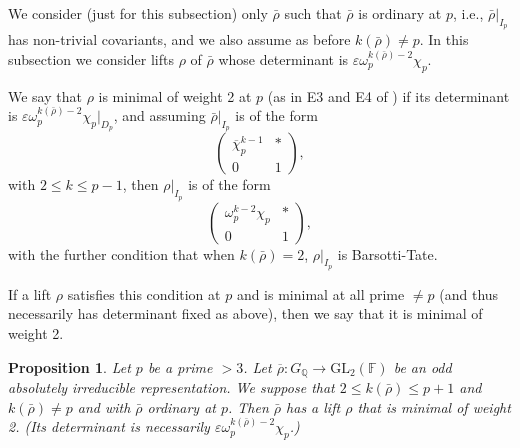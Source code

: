 \documentclass[12pt]{amsart}
\newcommand{\Q}{\mathbb{Q}}
\newcommand{\rhobar}{\overline{\rho}}
\newtheorem{prop}[theorem]{Proposition}
\def\rhobar{ {\bar {\rho} } }
\def\rhob{ {\bar {\rho} } }
\newcommand{\F}{{\mathbb F}}
\newcommand{\vep}{{\varepsilon}}
\begin{document}
We consider (just for this subsection) only
$\rhob$ such that
$\rhob$ is ordinary at $p$, i.e., $\rhob|_{I_p}$ has non-trivial
covariants, and we also assume as before $k(\rhob) \neq p$.
In this subsection we consider lifts 
$\rho$ of $\rhobar$ whose determinant is $\vep\omega_p^{k(\rhob)-2}\chi_p$.


We say that $\rho$ is minimal of weight 2 at $p$ (as in E3 and E4 of
\cite{Tay3})  if 
its determinant is $\vep\omega_p^{k(\rhob)-2}\chi_p|_{D_p}$, and assuming $\rhob|_{I_p}$
is of the form
$$\left( \begin{array}{cc}
    \overline \chi_p ^{k-1} & *  \\
    0 & 1
\end{array} \right),$$ with $2 \leq k \leq p-1$, then $\rho|_{I_p}$ is of
the form
$$\left( \begin{array}{cc}
    \omega_p^{k-2}\chi_p  & *  \\
    0 & 1
\end{array} \right),$$ with the further condition that when $k(\rhobar)=2$, $\rho|_{I_p}$ is Barsotti-Tate. 

If a lift $\rho$ satisfies this condition at $p$ and is minimal at all prime $\neq p$ (and thus necessarily
has determinant fixed as above), then we say that it is minimal
of weight 2.

\begin{prop}\label{p}
Let $p$ be a prime $> 3$.
Let $\overline{\rho} : G_{\Q}\rightarrow
\mathrm{GL}_2 (\F)$ be an odd absolutely irreducible representation.
We suppose that $2 \leq k(\rhob) \leq p+1$ and
 $k(\rhob)\not= p$ and with $\rhob$ ordinary at $p$. Then
$\rhob$ has  a lift $\rho$ that is minimal of weight 2. (Its determinant
is necessarily $\vep\omega_p^{k(\rhob)-2}\chi_p$.)
\end{prop}
\end{document}
